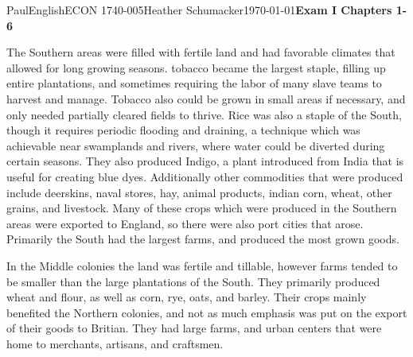 \documentclass[12pt,letterpaper]{article}
\begin{document}
\begin{mla}{Paul}{English}{ECON 1740-005}{Heather
    Schumacker}{\today}{\textbf{Exam I Chapters 1-6}}


The Southern areas were filled with fertile land and had favorable
climates that allowed for long growing seasons. tobacco became the
largest staple, filling up entire plantations, and sometimes requiring
the labor of many slave teams to harvest and manage. Tobacco also
could be grown in small areas if necessary, and only needed partially
cleared fields to thrive. Rice was also a staple of the South, though
it requires periodic flooding and draining, a technique which was
achievable near swamplands and rivers, where water could be diverted
during certain seasons. They also produced Indigo, a plant introduced
from India that is useful for creating blue dyes. Additionally other
commodities that were produced include deerskins, naval stores, hay,
animal products, indian corn, wheat, other grains, and livestock. Many
of these crops which were produced in the Southern areas were exported
to England, so there were also port cities that arose. Primarily the
South had the largest farms, and produced the most grown goods. 


In the Middle colonies the land was fertile and tillable, however
farms tended to be smaller than the large plantations of the South.
They primarily produced wheat and flour, as well as corn, rye, oats,
and barley. Their crops mainly benefited the Northern colonies, and
not as much emphasis was put on the export of their goods to Britian.
They had large farms, and urban centers that were home to merchants,
artisans, and craftsmen. 



\end{mla}
\end{document}
